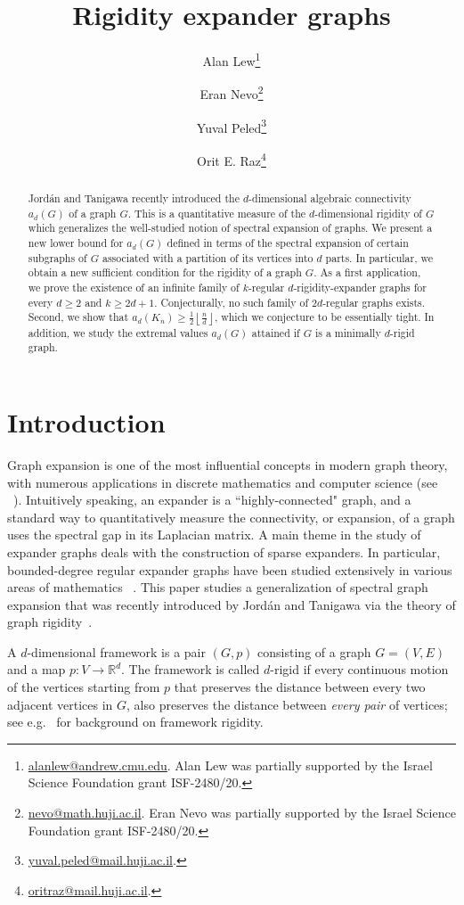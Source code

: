 \documentclass[a4paper,11pt]{article}
\title{Rigidity expander graphs}
\author[2]{Alan Lew\thanks{\href{mailto:alanlew@andrew.cmu.edu}{alanlew@andrew.cmu.edu}. Alan Lew was partially supported by the Israel Science Foundation grant ISF-2480/20.}}
\author[1]{Eran Nevo\thanks{\href{mailto:nevo@math.huji.ac.il}{nevo@math.huji.ac.il}. Eran Nevo was partially supported by the Israel Science Foundation grant ISF-2480/20.}}
\author[1]{Yuval Peled\thanks{\href{mailto:yuval.peled@mail.huji.ac.il}{yuval.peled@mail.huji.ac.il}.}}
\author[1]{Orit E. Raz\thanks{\href{mailto:oritraz@mail.huji.ac.il}{oritraz@mail.huji.ac.il}.}}
\affil[1]{Einstein Institute of Mathematics,
 Hebrew University, Jerusalem~91904, Israel}
\affil[2]{Dept. Math. Sciences, Carnegie Mellon University, Pittsburgh, PA 15213, USA}
\date{}
\theoremstyle{plain}
\theoremstyle{definition}
\newcommand{\Rea}{{\mathbb R}}
\newcommand{\lfrac}[2]{\left\lfloor\frac{#1}{#2}\right\rfloor}
\begin{document}
	\maketitle

\begin{abstract}
Jord\'an and Tanigawa recently introduced the $d$-dimensional algebraic connectivity $a_d(G)$ of a graph $G$. This is a quantitative measure of the $d$-dimensional rigidity of $G$ which generalizes the well-studied notion of spectral expansion of graphs. We present a new lower bound for $a_d(G)$ defined in terms of the spectral expansion of certain subgraphs of $G$ associated with a partition of its vertices into $d$ parts. In particular, we obtain a new sufficient condition for the rigidity of a graph $G$. 
As a first application, we prove the existence of an infinite family of $k$-regular $d$-rigidity-expander graphs for every $d\ge 2$ and $k\ge 2d+1$. Conjecturally, no such family of $2d$-regular graphs exists. Second, we show that $a_d(K_n)\geq \frac{1}{2}\lfrac{n}{d}$, which we conjecture to be essentially tight. In addition, we study the extremal values $a_d(G)$ attained if $G$ is a minimally $d$-rigid graph.
\end{abstract}

\section{Introduction}

Graph expansion is one of the most influential concepts in modern graph theory, with numerous applications in discrete mathematics and computer science (see ~\cite{hoory2006expander,lubotzky2012expander}). Intuitively speaking, an expander is a ``highly-connected" graph, and a standard way to quantitatively measure the connectivity, or expansion, of a graph uses the spectral gap in its Laplacian matrix. A main theme in the study of expander graphs deals with the construction of sparse expanders. In particular, bounded-degree regular expander graphs have been studied extensively in various areas of mathematics ~\cite{gabber1981explicit,LPS,zigzag,friedman_alon,MSS}. This paper studies a generalization of spectral graph expansion that was recently introduced by Jord\'an and Tanigawa via the theory of graph rigidity~\cite{jordan2022rigidity}.

A $d$-dimensional framework is a pair $(G,p)$ consisting of a graph $G=(V,E)$ and a map $p:V\to \Rea^d$. The framework is called $d$-rigid if every continuous motion of the vertices starting from $p$ that preserves the distance between every two adjacent vertices in $G$, also preserves the distance between \emph{every pair} of vertices; see e.g.~\cite{Connelly:RigiditySurvey, graver1993book} for background on framework rigidity. 
\end{document}

